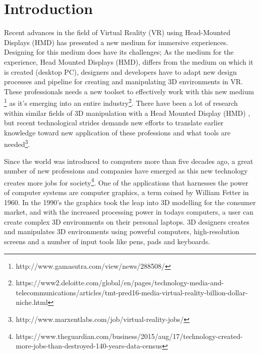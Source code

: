
\chapter{Introduction}

Recent advances in the field of Virtual Reality (VR) using Head-Mounted Displays (HMD) has presented a new medium for immersive experiences. Designing for this medium does have its challenges; As the medium for the experience, Head Mounted Displays (HMD), differs from the medium on which it is created (desktop PC), designers and developers have to adapt new design processes and pipeline for creating and manipulating 3D environments in VR. These professionals needs a new toolset to effectively work with this new medium \footnote{http://www.gamasutra.com/view/news/288508/} as it's emerging into an entire industry\footnote{https://www2.deloitte.com/global/en/pages/technology-media-and-telecommunications/articles/tmt-pred16-media-virtual-reality-billion-dollar-niche.html}. There have been a lot of research within similar fields of 3D manipulation with a Head Mounted Display (HMD)  \cite{relatedwork:kijimaand1997transition} \cite{relatedwork:bowman1996conceptual} \cite{relatedwork:stoakley1995virtual} \cite{relatedwork:mine1995isaac}, but recent technological strides demands new efforts to translate earlier knowledge toward new application of these professions and what tools are needed\footnote{http://www.marxentlabs.com/job/virtual-reality-jobs/}.

Since the world was introduced to computers more than five decades ago, a great number of new professions and companies have emerged as this new technology creates more jobs for society\footnote{https://www.theguardian.com/business/2015/aug/17/technology-created-more-jobs-than-destroyed-140-years-data-census}. One of the applications that harnesses the power of computer systems are computer graphics, a term coined by William Fetter in 1960\cite{3D_history:graphics_2017}. In the 1990's the graphics took the leap into 3D modelling for the consumer market, and with the increased processing power in todays computers, a user can create complex 3D environments on their personal laptops. 3D designers creates and manipulates 3D environments using powerful computers, high-resolution screens and a number of input tools like pens, pads and keyboards.


